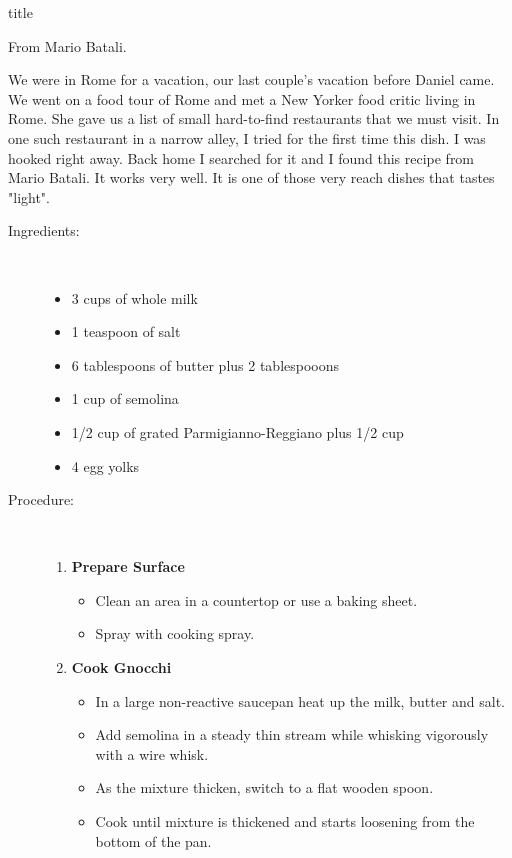 \documentclass [11pt, letterpaper] {article}
\begin{document}
 {title}

\begin{flushright}
{From Mario Batali.}
\end{flushright}

We were in Rome for a vacation, our last couple's vacation before Daniel came. We went on a food tour of Rome and met a New Yorker food critic living in Rome. She gave us a list of small hard-to-find restaurants that we must visit. In one such restaurant in a narrow alley, I tried for the first time this dish. I was hooked right away. Back home I searched for it and I found this recipe from Mario Batali. It works very well. It is one of those very reach dishes that tastes "light".

\begin{description}

\item[Ingredients:]\ \\
	\begin{itemize}
	\item	3 cups of whole milk
	\item 1 teaspoon of salt
	\item 6 tablespoons of butter plus 2 tablespooons
	\item 1 cup of semolina
	\item 1/2 cup of grated Parmigianno-Reggiano plus 1/2 cup
	\item 4 egg yolks
	\end{itemize}

\item[Procedure:]\ \\

	\begin{enumerate}
	\item {\bf Prepare Surface}
	\begin{itemize}
	\item Clean an area in a countertop or use a baking sheet. 
	\item Spray with cooking spray.
	\end{itemize}
	
	\item {\bf Cook Gnocchi }
	\begin{itemize}
	\item In a large non-reactive saucepan heat up the milk, butter and salt.
	\item Add semolina in a steady thin stream while whisking vigorously with a wire whisk.
	\item As the mixture thicken, switch to a flat wooden spoon. 
	\item Cook until mixture is thickened and starts loosening from the bottom of the pan.
	\end{itemize}


\end{enumerate}
\end{description}
\end{document}
